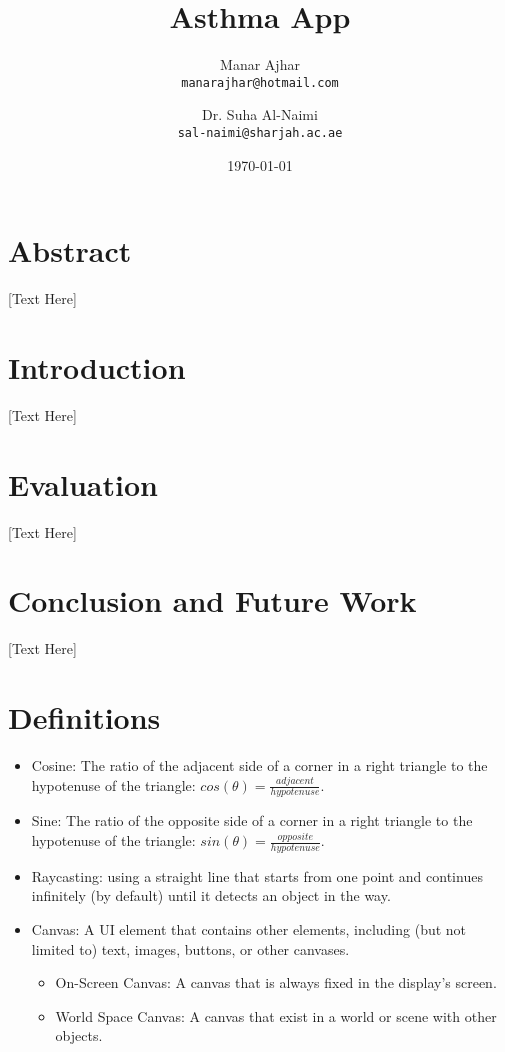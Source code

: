 \documentclass[a4paper, 12pt]{article}
\title{Asthma App}
\author{Manar Ajhar \\ \texttt{manarajhar@hotmail.com} \and Dr. Suha Al-Naimi \\ \texttt{sal-naimi@sharjah.ac.ae}}
\date{\today}
\begin{document}
\maketitle

\section*{Abstract}
[Text Here]

\section{Introduction}
[Text Here]


\section{Evaluation}
[Text Here]
\section{Conclusion and Future Work}
[Text Here]

\section{Definitions}
\label{DefinitionsSec}
\begin{itemize}
    \item{Cosine: The ratio of the adjacent side of a corner in a right triangle to the hypotenuse of the triangle: $cos(\theta) = \frac{adjacent}{hypotenuse}$.}

    \item{Sine: The ratio of the opposite side of a corner in a right triangle to the hypotenuse of the triangle: $sin(\theta) = \frac{opposite}{hypotenuse}$.}
    
    \item{Raycasting: using a straight line that starts from one point and continues infinitely (by default) until it detects an object in the way.}
    
    \item{Canvas: A UI element that contains other elements, including (but not limited to) text, images, buttons, or other canvases.}

\begin{itemize}
    \item{On-Screen Canvas: A canvas that is always fixed in the display’s screen.}
    
    \item{World Space Canvas: A canvas that exist in a world or scene with other objects.}
\end{itemize}

\end{itemize}
\end{document}

